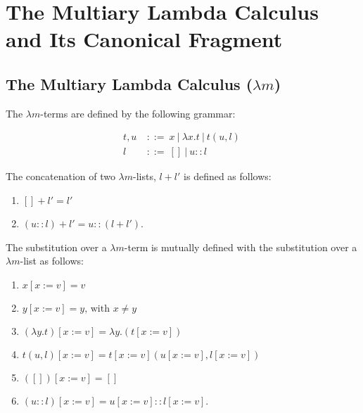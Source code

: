\chapter{The Multiary Lambda Calculus and Its Canonical Fragment }
\label{c:multiary}

\section{The Multiary Lambda Calculus ($\lambda m$)}

\begin{definition}
  The $\lambda m$-terms are defined by the following grammar:
  
  \begin{align*} 
    t, u \ &::= \ x \ | \ \lambda x . t \ | \ t(u, l) \ \\
    l      &::= \ []\  | \ u :: l
  \end{align*}
\end{definition}

\begin{definition}
  The concatenation of two $\lambda m$-lists, $l + l'$ is defined as follows:

  \begin{enumerate}
  \item $[] + l' = l'$
  \item $(u::l) + l' = u::(l + l')$.
  \end{enumerate}
\end{definition}


\begin{definition}
  The substitution over a $\lambda m$-term is mutually defined with the substitution over a $\lambda m$-list as follows:
  
  \begin{enumerate}
  \item $x[x := v] = v$
  \item $y[x := v] = y \text{, with } x \neq y$
  \item $(\lambda y . t)[x := v] = \lambda y . (t[x := v])$
  \item $t(u, l)[x := v] = t[x := v](u[x := v], l[x := v])$

  \item $([])[x := v] = []$
  \item $(u::l)[x := v] = u[x := v] :: l[x := v]$.
  \end{enumerate}
\end{definition}

